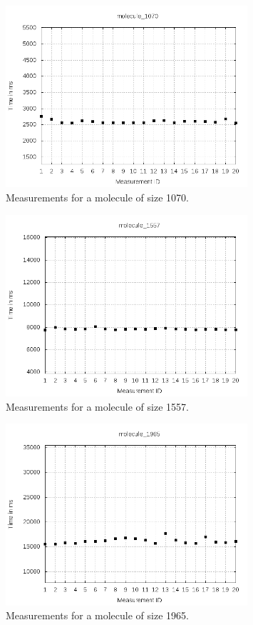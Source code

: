 \documentclass[a4paper,12pt]{article}
\begin{document}
\begin{figure}[!h]
  \centering
    \includegraphics[width=0.8\textwidth]{images/solver-perf-molecule_1070.png}
  \caption{Measurements for a molecule of size 1070.}
\end{figure}

\begin{figure}[!h]
  \centering
    \includegraphics[width=0.8\textwidth]{images/solver-perf-molecule_1557.png}
  \caption{Measurements for a molecule of size 1557.}
\end{figure}

\begin{figure}[!h]
  \centering
    \includegraphics[width=0.8\textwidth]{images/solver-perf-molecule_1965.png}
  \caption{Measurements for a molecule of size 1965.}
\end{figure}
\end{document}
